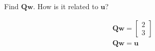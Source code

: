 Find $\boldsymbol{Qw}$. How is it related to $\boldsymbol{u}$?

\begin{solution}
\begin{align*}
    \boldsymbol{Qw} = \begin{bmatrix}
        2 \\ 3
    \end{bmatrix} \\
    \boldsymbol{Qw} = \boldsymbol{u}
\end{align*}
\end{solution}
